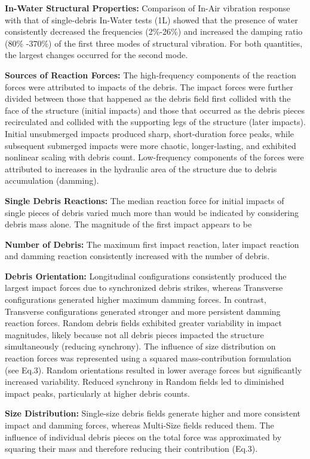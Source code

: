 \documentclass[10pt,a4paper]{article}
\begin{document}
\textbf{In-Water Structural Properties:} Comparison of In-Air vibration response with that of single-debris In-Water tests (1L) showed that the presence of water consistently decreased the frequencies (2\%-26\%) and increased the damping ratio (80\% -370\%) of the first three modes of structural vibration. For both quantities, the largest changes occurred for the second mode.

\textbf{Sources of Reaction Forces:} The high-frequency components of the reaction forces were attributed to impacts of the debris. The impact forces were further divided between those that happened as the debris field first collided with the face of the structure (initial impacts) and those that occurred as the debris pieces recirculated and collided with the supporting legs of the structure (later impacts). Initial unsubmerged impacts produced sharp, short-duration force peaks, while subsequent submerged impacts were more chaotic, longer-lasting, and exhibited nonlinear scaling with debris count. Low-frequency components of the forces were attributed to increases in the hydraulic area of the structure due to debris accumulation (damming).

\textbf{Single Debris Reactions:}  The median reaction force for initial impacts of single pieces of debris varied much more than would be indicated by considering debris mass alone.  The magnitude of the first impact appears to be 

\textbf{Number of Debris:} The maximum first impact reaction, later impact reaction and damming reaction consistently increased with the number of debris.  

\textbf{Debris Orientation:} Longitudinal configurations consistently produced the largest impact forces due to synchronized debris strikes, whereas Transverse configurations generated higher maximum damming forces.  In contrast, Transverse configurations generated stronger and more persistent damming reaction forces. Random debris fields exhibited greater variability in impact magnitudes, likely because not all debris pieces impacted the structure simultaneously (reducing synchrony). The influence of size distribution on reaction forces was represented using a squared mass-contribution formulation (see Eq.3). Random orientations resulted in lower average forces but significantly increased variability. Reduced synchrony in Random fields led to diminished impact peaks, particularly at higher debris counts.
    
\textbf{Size Distribution:} Single-size debris fields generate higher and more consistent impact and damming forces, whereas Multi-Size fields reduced them. The influence of individual debris pieces on the total force was approximated by squaring their mass and therefore reducing their contribution (Eq.3).
 
\end{document}
